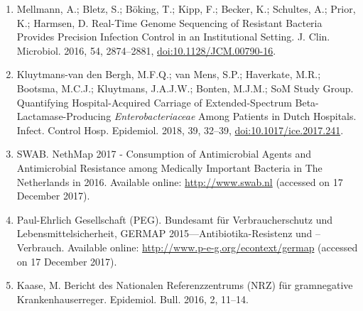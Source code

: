 \documentclass[
]{book}
\begin{document}
\begin{enumerate}
\item
  Mellmann, A.; Bletz, S.; Böking, T.; Kipp, F.; Becker, K.; Schultes, A.; Prior, K.; Harmsen, D. Real-Time Genome Sequencing of Resistant Bacteria Provides Precision Infection Control in an Institutional Setting. J. Clin. Microbiol. 2016, 54, 2874--2881, \url{doi:10.1128/JCM.00790-16}.
\item
  Kluytmans-van den Bergh, M.F.Q.; van Mens, S.P.; Haverkate, M.R.; Bootsma, M.C.J.; Kluytmans, J.A.J.W.; Bonten, M.J.M.; SoM Study Group. Quantifying Hospital-Acquired Carriage of Extended-Spectrum Beta-Lactamase-Producing \emph{Enterobacteriaceae} Among Patients in Dutch Hospitals. Infect. Control Hosp. Epidemiol. 2018, 39, 32--39, \url{doi:10.1017/ice.2017.241}.
\item
  SWAB. NethMap 2017 - Consumption of Antimicrobial Agents and Antimicrobial Resistance among Medically Important Bacteria in The Netherlands in 2016. Available online: \url{http://www.swab.nl} (accessed on 17 December 2017).
\item
  Paul-Ehrlich Gesellschaft (PEG). Bundesamt für Verbraucherschutz und Lebensmittelsicherheit, GERMAP 2015---Antibiotika-Resistenz und --Verbrauch. Available online: \url{http://www.p-e-g.org/econtext/germap} (accessed on 17 December 2017).
\item
  Kaase, M. Bericht des Nationalen Referenzzentrums (NRZ) für gramnegative Krankenhauserreger. Epidemiol. Bull. 2016, 2, 11--14.
\end{enumerate}

  
\end{document}
